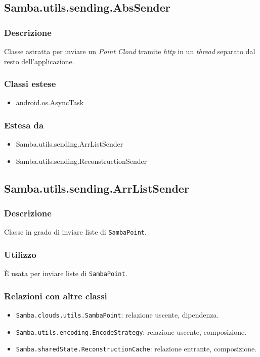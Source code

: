 \subsection{Samba.utils.sending.AbsSender}
\subsubsection{Descrizione}
Classe astratta per inviare un \emph{Point Cloud} tramite \emph{http} in un \emph{thread} separato dal resto dell'applicazione.
\subsubsection{Classi estese}
\begin{itemize}
	\item android.os.AsyncTask
\end{itemize}
\subsubsection{Estesa da}
\begin{itemize}
	\item Samba.utils.sending.ArrListSender
	\item Samba.utils.sending.ReconstructionSender
\end{itemize}

\subsection{Samba.utils.sending.ArrListSender}
\subsubsection{Descrizione}
Classe in grado di inviare liste di \texttt{SambaPoint}.
\subsubsection{Utilizzo}
È usata per inviare liste di \texttt{SambaPoint}.
\subsubsection{Relazioni con altre classi}
\begin{itemize}
	\item \texttt{Samba.clouds.utils.SambaPoint}: relazione uscente, dipendenza.
	\item \texttt{Samba.utils.encoding.EncodeStrategy}: relazione uscente, composizione.
	\item \texttt{Samba.sharedState.ReconstructionCache}: relazione entrante, composizione.
\end{itemize}
